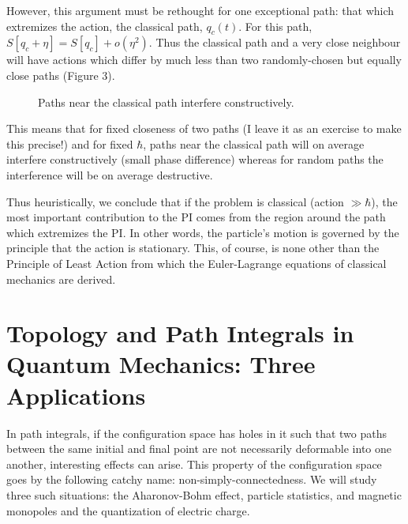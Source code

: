 \documentclass[12pt]{article}
\begin{document}
However, this argument must be rethought for one exceptional path: that
which extremizes the action, \ie the classical path, $q_c(t)$. 
For this path, $S[q_c+\eta]=S[q_c]+o(\eta^2)$. Thus the classical path
and a very close neighbour will have actions which differ by much less
than two randomly-chosen but equally close paths (Figure 3).
\begin{figure}[ht]
\epsfysize=5cm
\centerline{}
\caption{Paths near the classical path interfere constructively.}
\end{figure}
This means that for fixed closeness of two paths (I leave it as an
exercise to make this precise!) and for fixed $\hbar$, paths near the
classical path will on average interfere constructively (small phase
difference) whereas for random paths the interference will be on
average destructive.

Thus heuristically, we conclude that if the problem is classical
(action $\gg\hbar$), the most important contribution to the PI comes
from the region around the path which extremizes the PI. In other
words, the particle's motion is governed by the principle that the
action is stationary. This, of course, is none other than the
Principle of Least Action from which the Euler-Lagrange equations of
classical mechanics are derived.



\section[Topology and Path Integrals]
{Topology and Path Integrals in Quantum Mechanics: Three Applications}

In path integrals, if the configuration space has holes in it such
that two paths between the same initial and final point are
not necessarily deformable into one another, interesting effects can
arise. This property of the configuration space goes by the following
catchy name: non-sim\-ply-con\-nec\-ted\-ness. We will study three
such situations: the Aharonov-Bohm effect, particle statistics, and
magnetic monopoles and the quantization of electric charge.
\end{document}
